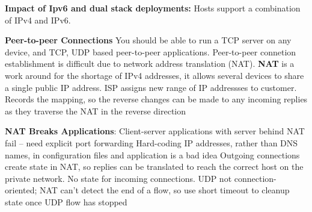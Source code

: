 \documentclass{article}
\begin{document}
\noindent \textbf{Impact of Ipv6 and dual stack deployments:}
Hosts support a combination of IPv4 and IPv6.

\noindent \textbf{Peer-to-peer Connections}
You should be able to run a TCP server on any device, and TCP, UDP based peer-to-peer applications.
Peer-to-peer connetion establishment is difficult due to network address translation (NAT).
\noindent \textbf{NAT} is a work around for the shortage of IPv4 addresses, it allows several devices to share a single public IP address.
ISP assigns new range of IP addressses to customer.
Records the mapping, so the reverse changes can be made to any incoming replies as they traverse the NAT in the reverse direction

\noindent \textbf{NAT Breaks Applications}:
Client-server applications with server behind NAT fail – need explicit port forwarding
Hard-coding IP addresses, rather than DNS names, in configuration files and application is a bad idea
Outgoing connections create state in NAT, so replies can be translated to reach the correct host on the private network.
No state for incoming connections.
UDP not connection-oriented; NAT can’t detect the end of a flow, so use short timeout to cleanup state once UDP flow has stopped
\end{document}
